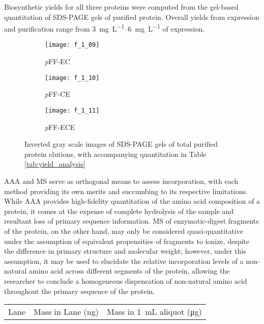 \begin{refsection}
Biosynthetic yields for all three proteins were computed from the gel-based
quantitation of SDS-PAGE gels of purified protein. Overall yields from
expression and purification range from \SIrange{3}{6}{\mg\per\L} of
expression.
\begin{figure}[h!]
    \centering
    \begin{subfigure}[b]{0.3\textwidth}
        \texttt{[image: f\_1\_09]}
        \caption{\emph{p}FF-EC}
        \label{fig:A}
    \end{subfigure}
    \begin{subfigure}[b]{0.3\textwidth}
        \texttt{[image: f\_1\_10]}
        \caption{\emph{p}FF-CE}
        \label{fig:B}
    \end{subfigure}
    \begin{subfigure}[b]{0.3\textwidth}
        \texttt{[image: f\_1\_11]}
        \caption{\emph{p}FF-ECE}
        \label{fig:C}
    \end{subfigure}
    \caption{Inverted gray scale images of SDS-PAGE gels of total purified
    protein elutions, with accompanying quantitation in Table
    \ref{tab:yield_analysis}}\label{fig:purification_gels}
\end{figure}
AAA and MS serve as orthogonal means to assess incorporation, with each method
providing its own merits and succumbing to its respective limitations. While AAA
provides high-fidelity quantitation of the amino acid composition of a protein,
it comes at the expense of complete hydrolysis of the sample and resultant loss
of primary sequence information. MS of enzymatic-digest fragments of the
protein, on the other hand, may only be considered quasi-quantitative under the
assumption of equivalent propensities of fragments to ionize, despite the
difference in primary structure and molecular weight; however, under this
assumption, it may be used to elucidate the relative incorporation levels of a
non-natural amino acid across different segments of the protein, allowing the
researcher to conclude a homogeneous dispensation of non-natural amino acid
throughout the primary sequence of the protein.
\begin{table}[h!]
    \centering
\begin{tabular}{ lllllll }
  \hline
  Lane & 
  \multicolumn{3}{c}{Mass in Lane (\si{\ng})} & 
  \multicolumn{3}{c}{Mass in \SI{1}{\mL} aliquot (\si{\ug})} \\

\end{tabular}
\end{table}
\end{refsection}
